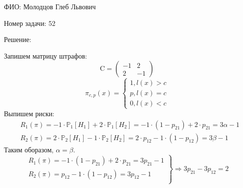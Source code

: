 \documentclass[14pt]{extarticle}
\begin{document}
ФИО: Молодцов Глеб Львович

\vspace{10pt}

Номер задачи: 52

\vspace{10pt}

Решение:

\vspace{10pt}

Запишем матрицу штрафов:
\begin{equation*}
\text{C} = \left(
\begin{array}{cccc}
-1 & 2 \\
2 & -1 
\end{array}
\right)
\end{equation*}
$$
\pi_{c, p}(x)=\left\{\begin{array}{l}
1, l(x)>c \\
p, l(x)=c \\
0, l(x)<c
\end{array}\right.
$$
Выпишем риски:
$$
\begin{aligned}
& R_1(\pi)=-1 \cdot \mathbb{P}_1\left[H_1\right]+2 \cdot \mathbb{P}_1\left[H_2\right]=-1 \cdot (1 - p_{21}) +2 \cdot p_{21} =3 \alpha-1 \\
& R_2(\pi)= 2 \cdot \mathbb{P}_2\left[H_1\right] -1 \cdot \mathbb{P}_2\left[H_2\right]=2 \cdot p_{12} -1 \cdot (1 - p_{12})=3 \beta-1
\end{aligned}
$$
Таким оборазом, $\alpha = \beta$. \\
$$
\left.
  \begin{array}{ccc}
    R_1(\pi) = -1 \cdot (1 - p_{21}) +2 \cdot p_{21} = 3 p_{21} - 1 \\
    R_2(\pi) = p_{12} -1 \cdot (1 - p_{12}) =3 p_{12} - 1 \\
  \end{array}
\right\} \Rightarrow 3 p_{21} - 3 p_{12} = 2
$$
\end{document}
